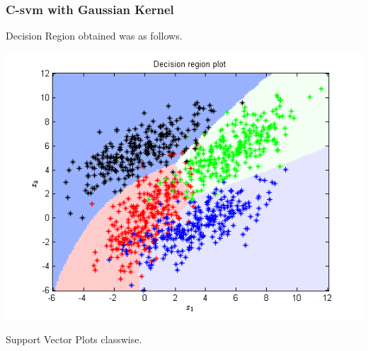 \documentclass{article}
\begin{document}
\subsubsection{C-svm with Gaussian Kernel}
Decision Region obtained was as follows.
\begin{center}
\includegraphics[scale=1]{Classification/1c/c_g/dec}
\end{center}
Support Vector Plots classwise.
\end{document}
